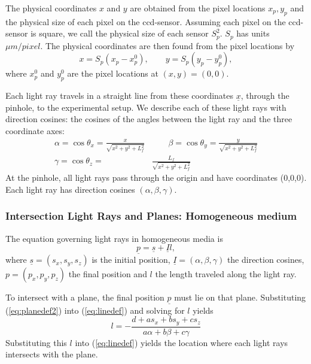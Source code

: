 \documentclass[draft]{svjour3}                     %
\begin{document}
The physical coordinates $x$ and $y$ are obtained from the pixel locations $x_p, y_p$  and the physical size of each pixel on the ccd-sensor. Assuming each pixel on the ccd-sensor is square, we call the physical size of each sensor $S_p^2$. $S_p$ has units $\mu m/pixel$. The physical coordinates are then found from the pixel locations by
\begin{equation}
	x = S_p (x_p-x_p^0), \qquad  y = S_p (y_p-y_p^0),
\end{equation}
where $x_p^0$ and $y_p^0$ are the pixel locations at $(x,y)=(0,0)$.

Each light ray travels in a straight line from these coordinates $\underline{x}$, through the pinhole, to the experimental setup. We describe each of these light rays with direction cosines: the cosines of the angles between the light ray and the three coordinate axes:
\begin{align}
\label{eq:directioncosines}
	\alpha = \cos \theta_x = \frac{x}{\sqrt{x^2+y^2+L_f^2}} &\qquad
	\beta = \cos \theta_y = \frac{y}{\sqrt{x^2+y^2+L_f^2}} \\
	\gamma = \cos \theta_z = &\frac{L_f}{\sqrt{x^2+y^2+L_f^2}} \nonumber
\end{align}
At the pinhole, all light rays pass through the origin and have coordinates (0,0,0). Each light ray has direction cosines $(\alpha, \beta, \gamma)$.

\subsubsection{Intersection Light Rays and Planes: Homogeneous medium}
The equation governing light rays in homogeneous media is
\begin{equation}
	\label{eq:linedef}
   \underline{p} = \underline{s} + \underline{I} l,
\end{equation}
where $\underline{s} = (s_x, s_y, s_z)$ is the initial position, $\underline{I} = (\alpha, \beta, \gamma)$ the direction cosines, $p = (p_x, p_y, p_z)$ the final position and $l$ the length traveled along the light ray. %

To intersect with a plane, the final position $\underline{p}$ must lie on that plane. Substituting (\ref{eq:planedef2}) into (\ref{eq:linedef}) and solving for $l$ yields 
\begin{equation}
	l = - \frac{d + a s_x + b s_y + c s_z}{a \alpha + b \beta + c \gamma}
\end{equation}
Substituting this $l$ into (\ref{eq:linedef}) yields the location where each light rays intersects with the plane.
\end{document}
